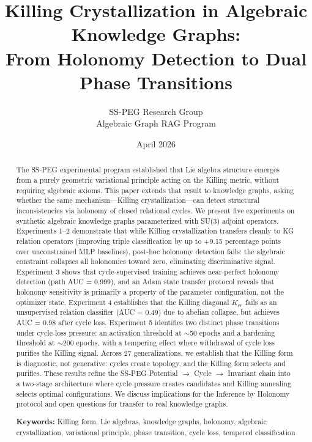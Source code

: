 \documentclass[11pt,letterpaper]{article}
\title{Killing Crystallization in Algebraic Knowledge Graphs:\\From Holonomy Detection to Dual Phase Transitions}
\author{SS-PEG Research Group \\
Algebraic Graph RAG Program}
\date{April 2026}
\begin{document}
\maketitle

\begin{abstract}
The SS-PEG experimental program established that Lie algebra structure emerges from a purely geometric variational principle acting on the Killing metric, without requiring algebraic axioms. This paper extends that result to knowledge graphs, asking whether the same mechanism---Killing crystallization---can detect structural inconsistencies via holonomy of closed relational cycles. We present five experiments on synthetic algebraic knowledge graphs parameterized with SU(3) adjoint operators. Experiments 1--2 demonstrate that while Killing crystallization transfers cleanly to KG relation operators (improving triple classification by up to +9.15 percentage points over unconstrained MLP baselines), post-hoc holonomy detection fails: the algebraic constraint collapses all holonomies toward zero, eliminating discriminative signal. Experiment 3 shows that cycle-supervised training achieves near-perfect holonomy detection (path AUC = 0.999), and an Adam state transfer protocol reveals that holonomy sensitivity is primarily a property of the parameter configuration, not the optimizer state. Experiment 4 establishes that the Killing diagonal $K_{rr}$ fails as an unsupervised relation classifier (AUC = 0.49) due to abelian collapse, but achieves AUC = 0.98 after cycle loss. Experiment 5 identifies two distinct phase transitions under cycle-loss pressure: an activation threshold at $\sim$50 epochs and a hardening threshold at $\sim$200 epochs, with a tempering effect where withdrawal of cycle loss purifies the Killing signal. Across 27 generalizations, we establish that the Killing form is diagnostic, not generative: cycles create topology, and the Killing form selects and purifies. These results refine the SS-PEG Potential $\to$ Cycle $\to$ Invariant chain into a two-stage architecture where cycle pressure creates candidates and Killing annealing selects optimal configurations. We discuss implications for the Inference by Holonomy protocol and open questions for transfer to real knowledge graphs.

\bigskip\noindent\textbf{Keywords:} Killing form, Lie algebras, knowledge graphs, holonomy, algebraic crystallization, variational principle, phase transition, cycle loss, tempered classification

\end{abstract}
\end{document}
